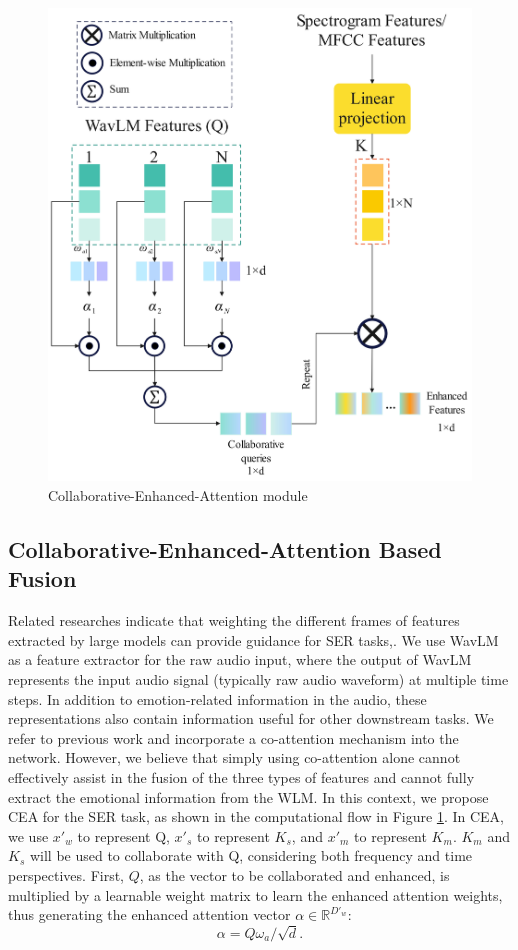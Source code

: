 \documentclass[runningheads]{llncs}
\begin{document}
\begin{figure}[htbp]
\centering
\includegraphics[width=1.0\linewidth]{attention_right.jpg}
\caption{Collaborative-Enhanced-Attention module}
\label{CEA}
\end{figure}
\subsection{Collaborative-Enhanced-Attention Based Fusion}
Related researches indicate that weighting the different frames of features extracted by large models can provide guidance for SER tasks\cite{b9},\cite{b19}. We use WavLM as a feature extractor for the raw audio input, where the output of WavLM represents the input audio signal (typically raw audio waveform) at multiple time steps. In addition to emotion-related information in the audio, these representations also contain information useful for other downstream tasks. We refer\cite{b19} to previous work and incorporate a co-attention mechanism into the network. However, we believe that simply using co-attention alone cannot effectively assist in the fusion of the three types of features and cannot fully extract the emotional information from the WLM. In this context, we propose CEA for the SER task, as shown in the computational flow in Figure \ref{CEA}. In CEA, we use \( x'_w \) to represent Q, \( x'_s\) to represent \( K_s \), and  \(x'_m \)  to represent \( K_m \). \( K_m \) and \( K_s \) will be used to collaborate with Q, considering both frequency and time perspectives. First, \( Q \), as the vector to be collaborated and enhanced, is multiplied by a learnable weight matrix to learn the enhanced attention weights, thus generating the enhanced attention vector \( \alpha \in \mathbb{R}^{D'_w} \):
\begin{equation}
\alpha=Q{\omega}_a/\sqrt{d}.
\end{equation}
\end{document}
